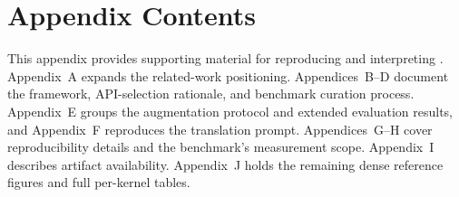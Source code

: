


% 

\newpage

\clearpage
{}
\section*{Appendix Contents}
\label{sec:appendix-contents}

This appendix provides supporting material for reproducing and interpreting \parbench{}. Appendix~A expands the related-work positioning. Appendices~B--D document the framework, API-selection rationale, and benchmark curation process. 
Appendix~E groups the augmentation protocol and extended evaluation results, and Appendix~F reproduces the translation prompt. Appendices~G--H cover reproducibility details and the benchmark's measurement scope. Appendix~I describes artifact availability. Appendix~J holds the remaining dense reference figures and full per-kernel tables.

\vspace{0.75em}

